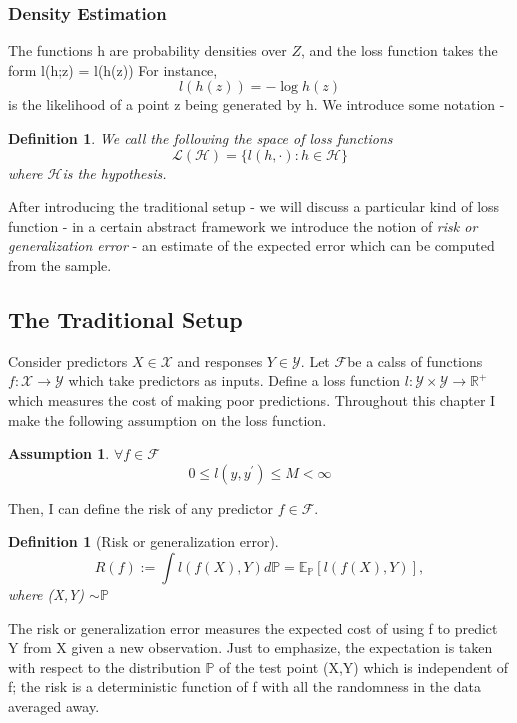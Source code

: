 \documentclass[12pt, oneside, a4paper]{article}
\def\cX{\ensuremath{\mathcal{X}}}
\def\cY{\ensuremath{\mathcal{Y}}}
\def\cF{\ensuremath{\mathcal{F}}}
\theoremstyle{plain}
\newtheorem{definition}[theorem]{Definition}
\theoremstyle{definition}
\newtheorem{assumption}{Assumption}
\def \cX{\mathcal{X}}
\newcommand{\lt}{<}
\begin{document}
\subsubsection{Density Estimation} 
The functions h are probability densities over $Z$, and the loss function takes the form l(h;z) = l(h(z))
For instance,
\begin{equation}
 l(h(z)) = - \log h(z)
\end{equation}
is the likelihood of a point z being generated by h.
We introduce some notation - 
\begin{definition}
 We call the following the \textit{space of loss functions}
\begin{equation*}
 \mathcal{L}(\mathcal{H}) = \lbrace l(h,\cdot) : h \in \mathcal{H} \rbrace
\end{equation*}
where $\mathcal{H}$is the hypothesis.
\end{definition}
After introducing the traditional setup - we will discuss a particular kind of loss function - in a certain abstract
framework we introduce the notion of \textit{risk or generalization error} - an estimate of the expected error which can be
computed from the sample. 
\subsection{The Traditional Setup}
Consider predictors $X \in \mathcal{X}$ and responses $Y \in \mathcal{Y}$. Let \cF be a calss of functions $f:\cX \rightarrow \cY$ which take predictors as inputs. 
   Define a loss function $l: \cY \times \cY \rightarrow \mathbb{R}^{+}$ which measures the cost of making poor predictions. 
 Throughout this chapter I make the following assumption on the loss function. 
 \begin{assumption}
 $\forall f \in \cF$
 \begin{equation*}
 0 \leq l(y,y^{'}) \leq M \lt \infty
 \end{equation*}
 \end{assumption}
 Then, I can define the risk of any predictor $f \in \cF$. 
 \begin{definition}[Risk or generalization error]\label{def:risk}
 \begin{equation}
R(f):= \int l(f(X),Y) d\mathbb{P} = \mathbb{E}_{\mathbb{P}}[l(f(X),Y)], \end{equation}
where (X,Y) $\sim \mathbb{P}$
 \end{definition}
 The risk or generalization error measures the expected cost of using f to predict Y from X given a new observation. 
 Just to emphasize, the expectation is taken with respect to the distribution $\mathbb{P}$ of the test point (X,Y) which is
 independent of f; the risk is a deterministic function of f with all the randomness in the data averaged away. 
\end{document}
